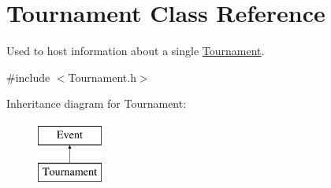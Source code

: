\hypertarget{class_tournament}{}\section{Tournament Class Reference}
\label{class_tournament}


Used to host information about a single \hyperlink{class_tournament}{Tournament}.  




{\ttfamily \#include $<$Tournament.\+h$>$}

Inheritance diagram for Tournament\+:\begin{figure}[H]
\begin{center}
\leavevmode
\includegraphics[height=2.000000cm]{class_tournament}
\end{center}
\end{figure}

